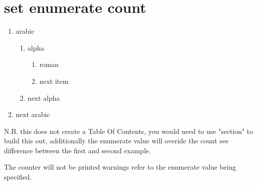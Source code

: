 \documentclass{report}
\begin{document}
\section{set enumerate count}
\begin{enumerate}[4] %
	\item arabic
	\begin{enumerate}
		\item alpha
			\begin{enumerate}
				\item roman
				\item next item
			\end{enumerate}
		\item next alpha			
	\end{enumerate}
	\item next arabic
\end{enumerate}

N.B. this does not create a Table Of Contents, you would need to use "section" to build this out, additionally the enumerate value will overide the count see difference between the first and second example.

The counter will not be printed warnings refer to the enumerate value being specified.
\clearpage
\end{document}
